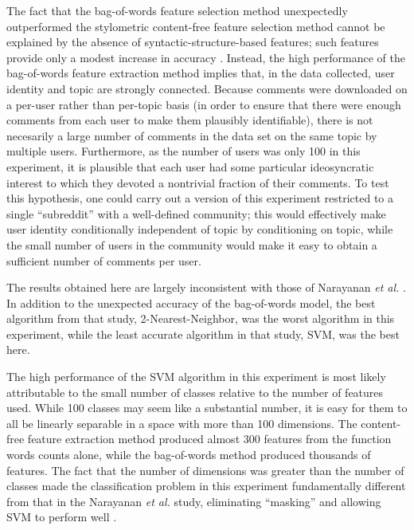 \documentclass{article}
\begin{document}
The fact that the bag-of-words feature selection method unexpectedly outperformed the stylometric content-free feature selection method cannot be explained by the absence of syntactic-structure-based features; such features provide only a modest increase in accuracy \cite{narayanan2012feasibility}. Instead, the high performance of the bag-of-words feature extraction method implies that, in the data collected, user identity and topic are strongly connected. Because comments were downloaded on a per-user rather than per-topic basis (in order to ensure that there were enough comments from each user to make them plausibly identifiable), there is not necesarily a large number of comments in the data set on the same topic by multiple users. Furthermore, as the number of users was only 100 in this experiment, it is plausible that each user had some particular ideosyncratic interest to which they devoted a nontrivial fraction of their comments. To test this hypothesis, one could carry out a version of this experiment restricted to a single ``subreddit'' with a well-defined community; this would effectively make user identity conditionally independent of topic by conditioning on topic, while the small number of users in the community would make it easy to obtain a sufficient number of comments per user.

The results obtained here are largely inconsistent with those of Narayanan \textit{et al.} \cite{narayanan2012feasibility}. In addition to the unexpected accuracy of the bag-of-words model, the best algorithm from that study, 2-Nearest-Neighbor, was the worst algorithm in this experiment, while the least accurate algorithm in that study, SVM, was the best here.

The high performance of the SVM algorithm in this experiment is most likely attributable to the small number of classes relative to the number of features used. While 100 classes may seem like a substantial number, it is easy for them to all be linearly separable in a space with more than 100 dimensions. The content-free feature extraction method produced almost 300 features from the function words counts alone, while the bag-of-words method produced thousands of features. The fact that the number of dimensions was greater than the number of classes made the classification problem in this experiment fundamentally different from that in the Narayanan \textit{et al.} study, eliminating ``masking'' and allowing SVM to perform well \cite{narayanan2012feasibility}.
\end{document}
